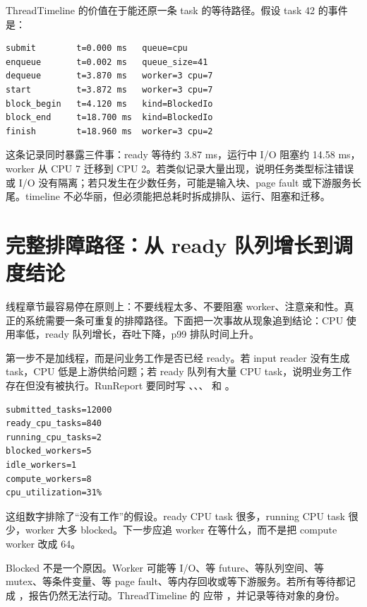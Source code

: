ThreadTimeline 的价值在于能还原一条 task 的等待路径。假设 task 42 的事件是：

\begin{lstlisting}[numbers=none,caption={task 42 的 timeline 摘要}]
submit        t=0.000 ms   queue=cpu
enqueue       t=0.002 ms   queue_size=41
dequeue       t=3.870 ms   worker=3 cpu=7
start         t=3.872 ms   worker=3 cpu=7
block_begin   t=4.120 ms   kind=BlockedIo
block_end     t=18.700 ms  kind=BlockedIo
finish        t=18.960 ms  worker=3 cpu=2
\end{lstlisting}

这条记录同时暴露三件事：ready 等待约 3.87 ms，运行中 I/O 阻塞约 14.58 ms，worker 从 CPU 7 迁移到 CPU 2。若类似记录大量出现，说明任务类型标注错误或 I/O 没有隔离；若只发生在少数任务，可能是输入块、page fault 或下游服务长尾。timeline 不必华丽，但必须能把总耗时拆成排队、运行、阻塞和迁移。

\section{完整排障路径：从 ready 队列增长到调度结论}

线程章节最容易停在原则上：不要线程太多、不要阻塞 worker、注意亲和性。真正的系统需要一条可重复的排障路径。下面把一次事故从现象追到结论：CPU 使用率低，ready 队列增长，吞吐下降，p99 排队时间上升。

第一步不是加线程，而是问业务工作是否已经 ready。若 input reader 没有生成 task，CPU 低是上游供给问题；若 ready 队列有大量 CPU task，说明业务工作存在但没有被执行。RunReport 要同时写 、、、 和 。

\begin{lstlisting}[numbers=none,caption={第一层快照：业务工作存在但没有执行槽}]
submitted_tasks=12000
ready_cpu_tasks=840
running_cpu_tasks=2
blocked_workers=5
idle_workers=1
compute_workers=8
cpu_utilization=31%
\end{lstlisting}

这组数字排除了“没有工作”的假设。ready CPU task 很多，running CPU task 很少，worker 大多 blocked。下一步应追 worker 在等什么，而不是把 compute worker 改成 64。

Blocked 不是一个原因。Worker 可能等 I/O、等 future、等队列空间、等 mutex、等条件变量、等 page fault、等内存回收或等下游服务。若所有等待都记成 ，报告仍然无法行动。ThreadTimeline 的  应带 ，并记录等待对象的身份。

